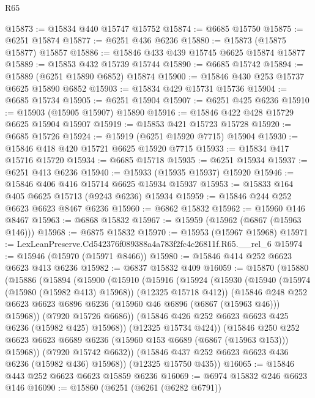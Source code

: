 \begin{lexlean}{R65}
\begin{coremodule}
{@15873 := @15834 @440 @15747 @15752
@15874 := @6685 @15750
@15875 := @6251 @15874
@15877 := @6251 @436 @6236
@15880 := @15873 (@15875 @15877) @15857
@15886 := @15846 @433 @439 @15745 @6625 @15874 @15877
@15889 := @15853 @432 @15739 @15744
@15890 := @6685 @15742
@15894 := @15889 (@6251 @15890 @6852) @15874
@15900 := @15846 @430 @253 @15737 @6625 @15890 @6852
@15903 := @15834 @429 @15731 @15736
@15904 := @6685 @15734
@15905 := @6251 @15904
@15907 := @6251 @425 @6236
@15910 := @15903 (@15905 @15907) @15890
@15916 := @15846 @422 @428 @15729 @6625 @15904 @15907
@15919 := @15853 @421 @15723 @15728
@15920 := @6685 @15726
@15924 := @15919 (@6251 @15920 @7715) @15904
@15930 := @15846 @418 @420 @15721 @6625 @15920 @7715
@15933 := @15834 @417 @15716 @15720
@15934 := @6685 @15718
@15935 := @6251 @15934
@15937 := @6251 @413 @6236
@15940 := @15933 (@15935 @15937) @15920
@15946 := @15846 @406 @416 @15714 @6625 @15934 @15937
@15953 := @15833 @164 @405 @6625 @15713 (@9243 @6236) @15934
@15959 := @15846 @244 @252 @6623 @6623 @8467 @6236
@15960 := @6862 @15832
@15962 := @15960 @146 @8467
@15963 := @6868 @15832
@15967 := @15959 (@15962 (@6867 (@15963 @146)))
@15968 := @6875 @15832
@15970 := @15953 (@15967 @15968)
@15971 := LexLeanPreserve.Cd542376f089388a4a783f2fc4c26811f.R65.__rel_6
@15974 := @15946 (@15970 (@15971 @8466))
@15980 := @15846 @414 @252 @6623 @6623 @413 @6236
@15982 := @6837 @15832 @409
@16059 := @15870
    (@15880
      (@15886
        (@15894
          (@15900
            (@15910
              (@15916
                (@15924
                  (@15930
                    (@15940 (@15974 (@15980 (@15982 @413) @15968)) (@12325 @15718 @412))
                    (@15846
                      @248
                      @252
                      @6623
                      @6623
                      @6896
                      @6236
                      (@15960 @46 @6896 (@6867 (@15963 @46)))
                      @15968))
                  (@7920 @15726 @6686))
                (@15846 @426 @252 @6623 @6623 @425 @6236 (@15982 @425) @15968))
              (@12325 @15734 @424))
            (@15846
              @250
              @252
              @6623
              @6623
              @6689
              @6236
              (@15960 @153 @6689 (@6867 (@15963 @153)))
              @15968))
          (@7920 @15742 @6632))
        (@15846 @437 @252 @6623 @6623 @436 @6236 (@15982 @436) @15968))
      (@12325 @15750 @435))
@16065 := @15846 @443 @252 @6623 @6623 @15859 @6236
@16069 := @6974 @15832 @246 @6623 @146
@16090 := @15860
    (@6251
      (@6261 (@6282 @6791))
}
\end{coremodule}
\end{lexlean}
